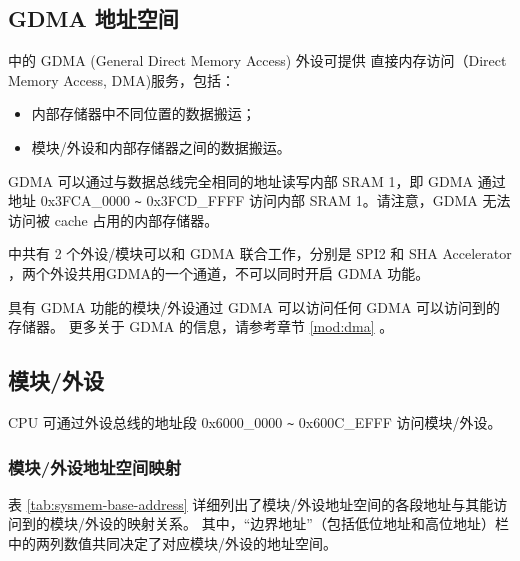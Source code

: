 \documentclass[main\_\_CN.tex]{subfiles}
\begin{document}
\subsection{GDMA 地址空间}

\chipname{} 中的 GDMA (General Direct Memory Access) 外设可提供 直接内存访问（Direct Memory Access, DMA)服务，包括：

\begin{itemize}
    \item 内部存储器中不同位置的数据搬运；
    \item 模块/外设和内部存储器之间的数据搬运。
\end{itemize}

GDMA 可以通过与数据总线完全相同的地址读写内部 SRAM 1，即 GDMA 通过地址 0x3FCA\_0000 \verb+~+ 0x3FCD\_FFFF 访问内部 SRAM 1。请注意，GDMA 无法访问被 cache 占用的内部存储器。


\chipname{} 中共有 2 个外设/模块可以和 GDMA 联合工作，分别是 SPI2 和 SHA Accelerator ，两个外设共用GDMA的一个通道，不可以同时开启 GDMA 功能。



具有 GDMA 功能的模块/外设通过 GDMA 可以访问任何 GDMA 可以访问到的存储器。
更多关于 GDMA 的信息，请参考章节 \ref{mod:dma} \textit{}。



\subsection{模块/外设}

CPU 可通过外设总线的地址段 0x6000\_0000 \verb+~+ 0x600C\_EFFF 访问模块/外设。

\subsubsection{模块/外设地址空间映射}

表 \ref{tab:sysmem-base-address} 详细列出了模块/外设地址空间的各段地址与其能访问到的模块/外设的映射关系。
其中，“边界地址”（包括低位地址和高位地址）栏中的两列数值共同决定了对应模块/外设的地址空间。



\end{document}
